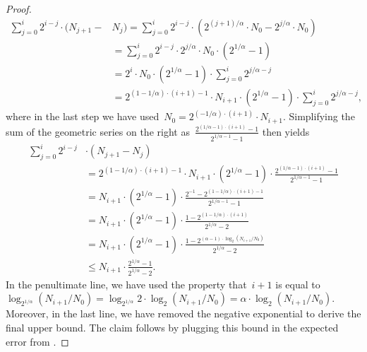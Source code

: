\documentclass[sigconf]{acmart}
\begin{document}
\begin{proof}
	\begin{align*}
        \sum_{j=0}^i  2^{i-j} \cdot  (N_{j+1} - & N_j) = \sum_{j=0}^i  2^{i-j} \cdot  (2^{(j+1)/\alpha}\cdot N_0 - 2^{j/\alpha}\cdot N_0)\\
		&=  \sum_{j=0}^i  2^{i-j} \cdot  2^{j/\alpha} \cdot N_0 \cdot (2^{1/\alpha} -1) \\
		&= 2^i \cdot N_0 \cdot (2^{1/\alpha} -1) \cdot   \sum_{j=0}^i   2^{j/\alpha- j} \\
        &= 2^{(1-1/\alpha) \cdot (i+1) - 1} \cdot N_{i+1} \cdot (2^{1/\alpha} -1) \cdot \sum_{j=0}^i   2^{j/\alpha- j},
	\end{align*}	
    where in the last step we have used~$N_0 = 2^{(-1/\alpha)\cdot(i+1)} \cdot
    N_{i+1}$. Simplifying the sum of the geometric series on the right
    as~$\frac{2^{(1/\alpha-1)\cdot(i+1)}-1}{2^{1/\alpha-1}-1}$ then yields
	\begin{align*}
        \sum_{j=0}^i  2^{i-j} & \cdot (N_{j+1} - N_j) \\
        &= 2^{(1-1/\alpha) \cdot (i+1) - 1} \cdot N_{i+1} \cdot (2^{1/\alpha} -1) \cdot \frac{2^{(1/\alpha-1) \cdot (i+1)} - 1}{2^{1/\alpha-1} - 1} \\
        &= N_{i+1} \cdot (2^{1/\alpha} -1) \cdot \frac{2^{-1} - 2^{(1-1/\alpha) \cdot (i+1) - 1}}{2^{1/\alpha-1} - 1} \\
        &= N_{i+1} \cdot (2^{1/\alpha} -1) \cdot \frac{1 - 2^{(1-1/\alpha) \cdot (i+1)}}{2^{1/\alpha} - 2} \\
        &= N_{i+1} \cdot (2^{1/\alpha} -1) \cdot \frac{1 - 2^{(\alpha-1) \cdot \log_2 (N_{i+1}/N_0)}}{2^{1/\alpha} - 2} \\
        &\leq N_{i+1} \cdot \frac{2^{1/\alpha} -1}{2^{1/\alpha} - 2}.
	\end{align*}	
    In the penultimate line, we have used the property that~$i+1$ is equal to
    $\log_{2^{1/\alpha}} (N_{i+1}/N_0) = \log_{2^{1/\alpha}} 2 \cdot \log_2
    (N_{i+1}/N_0) = \alpha \cdot \log_2 (N_{i+1}/N_0)$. Moreover, in the last
    line, we have removed the negative exponential to derive the final upper
    bound. The claim follows by plugging this bound in the expected error from
    .
\end{proof}
\end{document}
